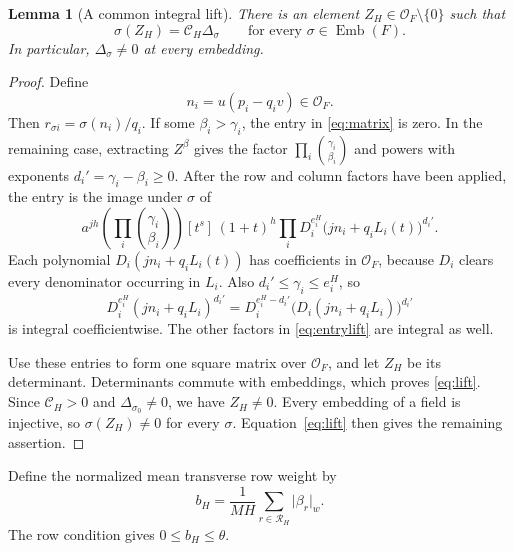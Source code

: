 \documentclass[11pt]{article}
\newtheorem{lemma}[theorem]{Lemma}
\theoremstyle{definition}
\theoremstyle{remark}
\theoremstyle{plain}
\newcommand{\OO}{\mathcal O}
\newcommand{\wt}[1]{\lvert #1\rvert_w}
\newcommand{\Emb}{\operatorname{Emb}}
\begin{document}
\begin{lemma}[A common integral lift]\label{lem:integral}
There is an element \(Z_H\in\OO_F\setminus\{0\}\) such that
\begin{equation}\label{eq:lift}
 \sigma(Z_H)=\mathscr C_H\Delta_\sigma
 \qquad\text{for every }\sigma\in\Emb(F).
\end{equation}
In particular, \(\Delta_\sigma\ne0\) at every embedding.
\end{lemma}
\begin{proof}
Define
\[
 n_i=u(p_i-q_iv)\in\OO_F.
\]
Then \(r_{\sigma i}=\sigma(n_i)/q_i\). If some
\(\beta_i>\gamma_i\), the entry in \eqref{eq:matrix} is zero. In
the remaining case, extracting \(Z^\beta\) gives the factor
\(\prod_i\binom{\gamma_i}{\beta_i}\) and powers with exponents
\(d_i'=\gamma_i-\beta_i\ge0\). After the row and column factors
have been applied, the entry is the image under \(\sigma\) of
\begin{equation}\label{eq:entrylift}
 a^{jh}\left(\prod_i\binom{\gamma_i}{\beta_i}\right)
 [t^s]\,(1+t)^h
 \prod_i D_i^{e_i^H}\bigl(jn_i+q_iL_i(t)\bigr)^{d_i'}.
\end{equation}
Each polynomial \(D_i(jn_i+q_iL_i(t))\) has coefficients in
\(\OO_F\), because \(D_i\) clears every denominator occurring in
\(L_i\). Also \(d_i'\le\gamma_i\le e_i^H\), so
\[
 D_i^{e_i^H}(jn_i+q_iL_i)^{d_i'}
 =D_i^{e_i^H-d_i'}\bigl(D_i(jn_i+q_iL_i)\bigr)^{d_i'}
\]
is integral coefficientwise. The other factors in \eqref{eq:entrylift}
are integral as well.

Use these entries to form one square matrix over \(\OO_F\), and let
\(Z_H\) be its determinant. Determinants commute with embeddings,
which proves \eqref{eq:lift}. Since \(\mathscr C_H>0\) and
\(\Delta_{\sigma_0}\ne0\), we have \(Z_H\ne0\). Every embedding
of a field is injective, so \(\sigma(Z_H)\ne0\) for every \(\sigma\).
Equation~\eqref{eq:lift} then gives the remaining assertion.
\end{proof}

Define the normalized mean transverse row weight by
\begin{equation}\label{eq:mean}
 b_H=\frac1{MH}\sum_{r\in\mathcal R_H}\wt{\beta_r}.
\end{equation}
The row condition gives \(0\le b_H\le\theta\).
\end{document}
